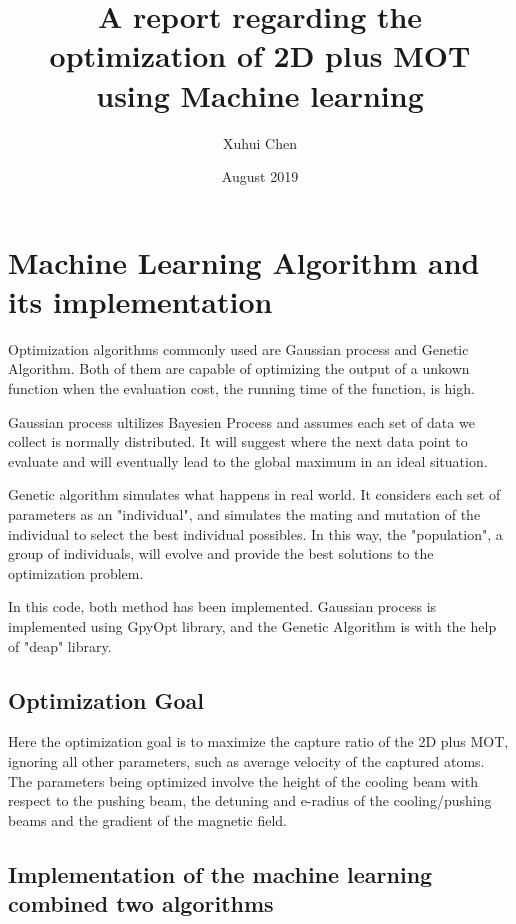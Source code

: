\documentclass{article}
\title{A report regarding the optimization of 2D plus MOT using Machine learning}
\author{Xuhui Chen}
\date{August 2019}
\begin{document}
\section{Machine Learning Algorithm and its implementation}
Optimization algorithms commonly used are Gaussian process and Genetic Algorithm. Both of them are capable of optimizing the output of a unkown function when the evaluation cost, the running time of the function, is high.

Gaussian process ultilizes Bayesien Process and assumes each set of data we collect is normally distributed. It will suggest where the next data point to evaluate and will eventually lead to the global maximum in an ideal situation.

Genetic algorithm simulates what happens in real world. It considers each set of parameters as an "individual", and simulates the mating and mutation of the individual to select the best individual possibles. In this way, the "population", a group of individuals, will evolve and provide the best solutions to the optimization problem.

In this code, both method has been implemented. Gaussian process is implemented using GpyOpt library, and the Genetic Algorithm is with the help of "deap" library.

\subsection{Optimization Goal}

Here the optimization goal is to maximize the capture ratio of the 2D plus MOT, ignoring all other parameters, such as average velocity of the captured atoms. The parameters being optimized involve the height of the cooling beam with respect to the pushing beam, the detuning and e-radius of the cooling/pushing beams and the gradient of the magnetic field.

\subsection{Implementation of the machine learning combined two algorithms}
\end{document}
